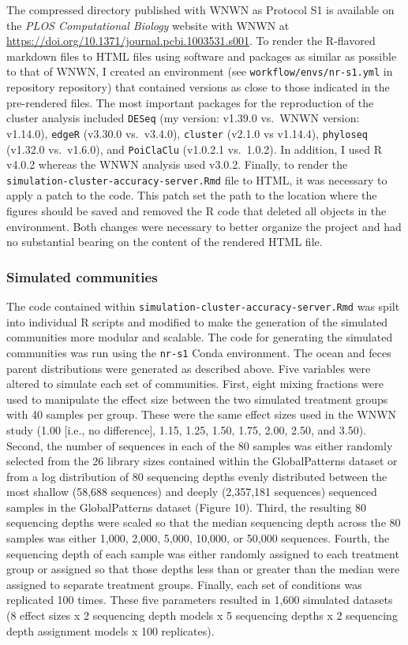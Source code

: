 \documentclass[
]{article}
\begin{document}
The compressed directory published with WNWN as Protocol S1 is available
on the \emph{PLOS Computational Biology} website with WNWN at
\url{https://doi.org/10.1371/journal.pcbi.1003531.s001}. To render the
R-flavored markdown files to HTML files using software and packages as
similar as possible to that of WNWN, I created an environment (see
\texttt{workflow/envs/nr-s1.yml} in repository repository) that
contained versions as close to those indicated in the pre-rendered
files. The most important packages for the reproduction of the cluster
analysis included \texttt{DESeq} (my version: v1.39.0 vs.~WNWN version:
v1.14.0), \texttt{edgeR} (v3.30.0 vs.~v3.4.0), \texttt{cluster} (v2.1.0
vs v1.14.4), \texttt{phyloseq} (v1.32.0 vs.~v1.6.0), and
\texttt{PoiClaClu} (v1.0.2.1 vs.~1.0.2). In addition, I used R v4.0.2
whereas the WNWN analysis used v3.0.2. Finally, to render the
\texttt{simulation-cluster-accuracy-server.Rmd} file to HTML, it was
necessary to apply a patch to the code. This patch set the path to the
location where the figures should be saved and removed the R code that
deleted all objects in the environment. Both changes were necessary to
better organize the project and had no substantial bearing on the
content of the rendered HTML file.

\hypertarget{simulated-communities}{%
\subsubsection{Simulated communities}\label{simulated-communities}}

The code contained within
\texttt{simulation-cluster-accuracy-server.Rmd} was spilt into
individual R scripts and modified to make the generation of the
simulated communities more modular and scalable. The code for generating
the simulated communities was run using the \texttt{nr-s1} Conda
environment. The ocean and feces parent distributions were generated as
described above. Five variables were altered to simulate each set of
communities. First, eight mixing fractions were used to manipulate the
effect size between the two simulated treatment groups with 40 samples
per group. These were the same effect sizes used in the WNWN study (1.00
{[}i.e., no difference{]}, 1.15, 1.25, 1.50, 1.75, 2.00, 2.50, and
3.50). Second, the number of sequences in each of the 80 samples was
either randomly selected from the 26 library sizes contained within the
GlobalPatterns dataset or from a log distribution of 80 sequencing
depths evenly distributed between the most shallow (58,688 sequences)
and deeply (2,357,181 sequences) sequenced samples in the GlobalPatterns
dataset (Figure 10). Third, the resulting 80 sequencing depths were
scaled so that the median sequencing depth across the 80 samples was
either 1,000, 2,000, 5,000, 10,000, or 50,000 sequences. Fourth, the
sequencing depth of each sample was either randomly assigned to each
treatment group or assigned so that those depths less than or greater
than the median were assigned to separate treatment groups. Finally,
each set of conditions was replicated 100 times. These five parameters
resulted in 1,600 simulated datasets (8 effect sizes x 2 sequencing
depth models x 5 sequencing depths x 2 sequencing depth assignment
models x 100 replicates).
\end{document}
